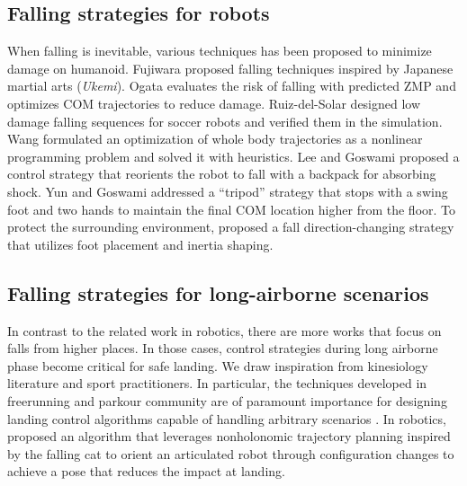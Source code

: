\subsection{Falling strategies for robots}
When falling is inevitable, various techniques has been proposed to
minimize damage on humanoid. 
Fujiwara \etal
\cite{Fujiwara:2002:UFM,Fujiwara:2003:FHH,Fujiwara:2006:TOF,Fujiwara:2007:OPF}
proposed falling techniques inspired by Japanese martial arts (\emph{Ukemi}).
Ogata \etal \cite{Ogata:2007:FMC,Ogata:2008:RSG} evaluates the risk of falling with
predicted ZMP and optimizes COM trajectories to reduce damage. 
Ruiz-del-Solar \etal \cite{Ruiz:2009:LTF,Ruiz:2010:FDM} designed low damage
falling sequences for soccer robots and verified them in the simulation. 
Wang \etal \cite{Wang:2012:WTO} formulated an optimization of whole body
trajectories as a nonlinear programming problem and solved it with heuristics.
Lee and Goswami \cite{Lee:2012:FOB} proposed a control strategy that
reorients the robot to fall with a backpack for absorbing shock. 
Yun and Goswami \cite{Yun:2014:TFC} addressed a ``tripod'' strategy that
stops with a swing foot and two hands to maintain the final COM location
higher from the floor.   
To protect the surrounding environment, \cite{Goswami:2014:DCF} proposed a
fall direction-changing strategy that utilizes foot placement and inertia
shaping.

\subsection{Falling strategies for long-airborne scenarios}
In contrast to the related work in robotics, 
there are more works that focus on falls from higher
places. In those cases, control strategies during long airborne phase
become critical for safe landing. We draw inspiration from
kinesiology literature and sport practitioners. In particular, the
techniques developed in freerunning and parkour community are of
paramount importance for designing landing control algorithms capable
of handling arbitrary scenarios
\cite{Edwardes:2009:TPF,HLJ:2011:URL}. 
In robotics, \cite{Bingham:2014:OMA} \etal proposed an algorithm 
that leverages nonholonomic trajectory planning inspired by the
falling cat to orient an articulated robot through configuration
changes to achieve a pose that reduces the impact at landing.

